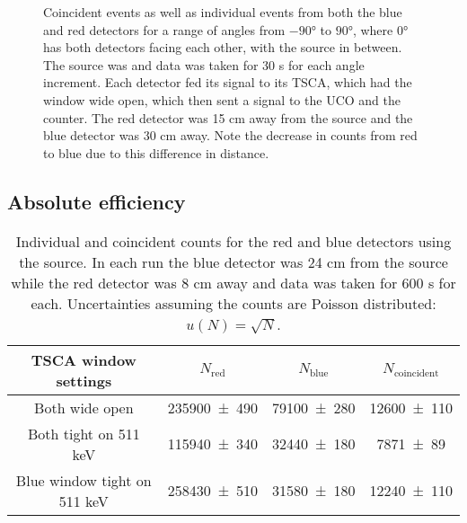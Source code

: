 \documentclass[11pt]{article}
\numberwithin{equation}{section}
\numberwithin{figure}{section}
\numberwithin{table}{section}
\begin{document}
\begin{figure}
    \begin{center}
       \caption{Coincident events as well as individual events from both the blue and red detectors for a range of angles from $\ang{-90}$ to $\ang{90}$, where $\ang{0}$ has both detectors facing each other, with the source in between. The source was  and data was taken for 30 s for each angle increment. Each detector fed its signal to its TSCA, which had the window wide open, which then sent a signal to the UCO and the counter. The red detector was 15 cm away from the source and the blue detector was 30 cm away. Note the decrease in counts from red to blue due to this difference in distance.}
       \label{fig:angular_3}
    \end{center}
\end{figure}

\subsection{Absolute efficiency}
\begin{table}[H]
    \centering
    \begin{tabular}{c|c|c|c}
        TSCA window settings & $N_{\text{red}}$ & $N_{\text{blue}}$ & $N_{\text{coincident}}$ \\\hline
        Both wide open & \num{235900(490)} & \num{79100(280)} & \num{12600(110)} \\
        Both tight on 511 keV & \num{115940(340)} & \num{32440(180)} & \num{7871(89)} \\
        Blue window tight on 511 keV & \num{258430(510)} & \num{31580(180)} & \num{12240(110)}
    \end{tabular}
    \caption{Individual and coincident counts for the red and blue detectors using the  source. In each run the blue detector was 24 cm from the source while the red detector was 8 cm away and data was taken for 600 s for each. Uncertainties assuming the counts are Poisson distributed: $u(N)=\sqrt{N}$.}
    \label{tbl:efficiency data}
\end{table}
\end{document}
